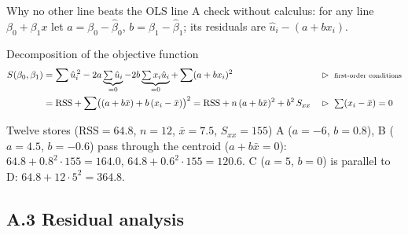 \documentclass[aspectratio=169,11pt]{beamer}
\begin{document}
\begin{frame}{Why no other line beats the OLS line}
  \small
  A check without calculus: for any line $\beta_0+\beta_1x$ let
  $a=\beta_0-\hat\beta_0$, $b=\beta_1-\hat\beta_1$; its residuals are
  $\hat u_i-(a+bx_i)$.
  \begin{block}{Decomposition of the objective function}
    \begin{align*}
      S(\beta_0,\beta_1)
        &= \sum\hat u_i^{\,2}-2a\underbrace{\textstyle\sum\hat u_i}_{=0}
           -2b\underbrace{\textstyle\sum x_i\hat u_i}_{=0}+\sum(a+bx_i)^2
         && \rhd\ \text{\scriptsize first-order conditions}\\
        &= \text{RSS}+\sum\bigl((a+b\bar x)+b\,(x_i-\bar x)\bigr)^2
         = \text{RSS}+n\,(a+b\bar x)^2+b^2\,S_{xx}
         && \rhd\ \textstyle\sum(x_i-\bar x)=0
    \end{align*}
    \vspace{-16pt}
  \end{block}
  \begin{exampleblock}{Twelve stores ($\text{RSS}=64.8$, $n=12$, $\bar x=7.5$, $S_{xx}=155$)}
    A ($a=-6$, $b=0.8$), B ($a=4.5$, $b=-0.6$) pass through the centroid
    ($a+b\bar x=0$): $64.8+0.8^2\cdot155=\mathbf{164.0}$,
    $64.8+0.6^2\cdot155=\mathbf{120.6}$. C ($a=5$, $b=0$) is parallel to D:
    $64.8+12\cdot5^2=\mathbf{364.8}$.
  \end{exampleblock}
\end{frame}

\subsection{A.3 Residual analysis}
\end{document}
